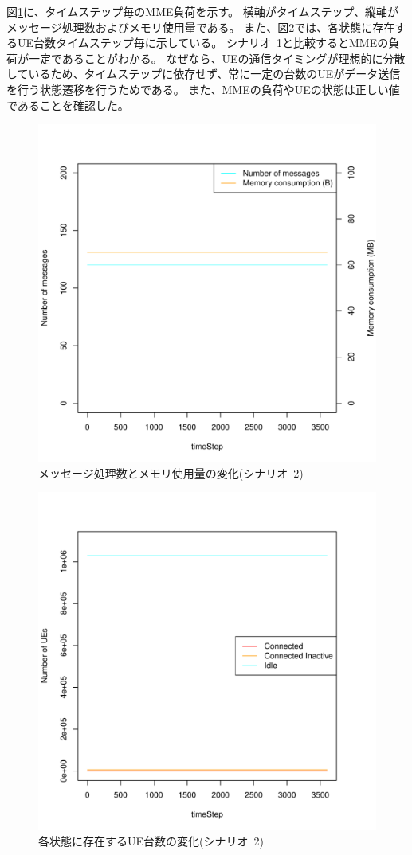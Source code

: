 \documentclass[a4j]{ujarticle}
\begin{document}
図\ref{scenario_2_signaling_and_memoryload_vs_timeStep}に、タイムステップ毎のMME負荷を示す。
横軸がタイムステップ、縦軸がメッセージ処理数およびメモリ使用量である。
また、図\ref{scenario_2_stateBreakdown}では、各状態に存在するUE台数タイムステップ毎に示している。
シナリオ~1と比較するとMMEの負荷が一定であることがわかる。
なぜなら、UEの通信タイミングが理想的に分散しているため、タイムステップに依存せず、常に一定の台数のUEがデータ送信を行う状態遷移を行うためである。
また、MMEの負荷やUEの状態は正しい値であることを確認した。
\begin{figure}[htbp]
  \begin{center}
    \includegraphics[width=0.6\hsize]{scenario_3_signaling_and_memoryload_vs_timeStep.pdf}
    \caption{メッセージ処理数とメモリ使用量の変化(シナリオ~2)}
    \label{scenario_2_signaling_and_memoryload_vs_timeStep}
  \end{center}
\end{figure}
\begin{figure}[htbp]
  \begin{center}
    \includegraphics[width=0.6\hsize]{scenario_3_stateBreakdown.pdf}
    \caption{各状態に存在するUE台数の変化(シナリオ~2)}
    \label{scenario_2_stateBreakdown}
  \end{center}
\end{figure}
\end{document}
